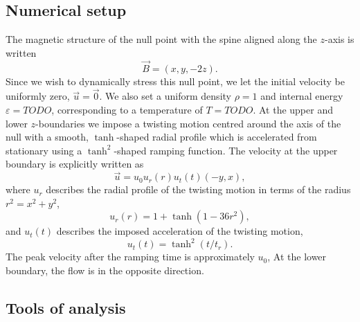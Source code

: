 \subsection{Numerical setup}

The magnetic structure of the null point with the spine aligned along the $z$-axis is written
\begin{equation}
  \label{eq:null_point_field}
  \vec{B} = (x, y, -2z).
\end{equation}
Since we wish to dynamically stress this null point, we let the initial velocity be uniformly zero, $\vec{u} = \vec{0}$. We also set a uniform density $\rho = 1$ and internal energy $\varepsilon = TODO$, corresponding to a temperature of $T = TODO$. At the upper and lower $z$-boundaries we impose a twisting motion centred around the axis of the null with a smooth, $\tanh$-shaped radial profile which is accelerated from stationary using a $\tanh^2$-shaped ramping function. The velocity at the upper boundary is explicitly written as
\begin{equation}
  \label{eq:null_twisting_profile}
  \vec{u} = u_0 u_r(r) u_t(t) (-y, x),
\end{equation}
where $u_r$ describes the radial profile of the twisting motion in terms of the radius $r^2 = x^2 + y^2$,
\begin{equation}
  \label{eq:radial_twisting_function}
  u_r(r) = 1 + \tanh(1 - 36r^2),
\end{equation}
and $u_t(t)$ describes the imposed acceleration of the twisting motion,
\begin{equation}
  \label{eq:ramping_up_function}
  u_t(t) = \tanh^2(t/t_r).
\end{equation}
The peak velocity after the ramping time is approximately $u_0$, At the lower boundary, the flow is in the opposite direction.

\subsection{Tools of analysis}

